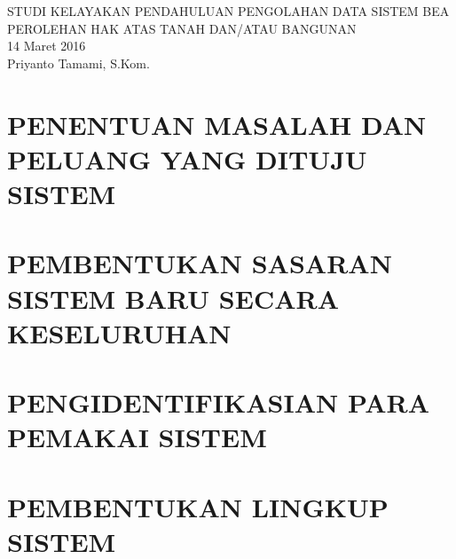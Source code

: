 \documentclass[pdftex,12pt, oneside]{article}
\begin{document}

%
\begin{center}
{\large STUDI KELAYAKAN PENDAHULUAN PENGOLAHAN DATA SISTEM BEA PEROLEHAN HAK ATAS TANAH DAN/ATAU BANGUNAN}
\\[1cm]
14 Maret 2016\\
Priyanto Tamami, S.Kom.
\end{center}


%
%

% 


%
%
%
%

%
%
%
% 
% 
% 

%
%


\section{PENENTUAN MASALAH DAN PELUANG YANG DITUJU SISTEM}


\section{PEMBENTUKAN SASARAN SISTEM BARU SECARA KESELURUHAN}


\section{PENGIDENTIFIKASIAN PARA PEMAKAI SISTEM}


\section{PEMBENTUKAN LINGKUP SISTEM}
\end{document}
